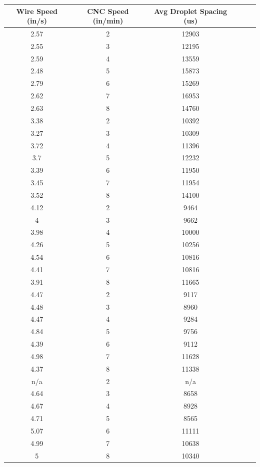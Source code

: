 \documentclass[12pt]{article}
\begin{document}
\begin{center}
\begin{tabular}{ |c|c|c|c|c|c| }
 
\end{tabular}


\end{center}

\clearpage

\begin{center}

\begin{tabular}{ |c|c|c|c|c|c| }


  \hline
  \textbf{Wire Speed (in/s)} & \textbf{CNC Speed (in/min)} & \textbf{Avg Droplet Spacing (us)} \\ \hline
  
2.57 &	2 &	12903 \\ \hline
2.55 &	3 &	12195 \\ \hline
2.59 &	4 &	13559 \\ \hline
2.48 &	5 &	15873 \\ \hline
2.79 &	6 &	15269 \\ \hline
2.62 &	7 &	16953 \\ \hline
2.63 &	8 &	14760 \\ \hline \hline
3.38 &	2 &	10392 \\ \hline
3.27 &	3 &	10309 \\ \hline
3.72 &	4 &	11396 \\ \hline
3.7 &	5 &	12232 \\ \hline
3.39 &	6 &	11950 \\ \hline
3.45 &	7 &	11954 \\ \hline
3.52 &	8 &	14100 \\ \hline \hline
4.12 &	2 &	9464 \\ \hline
4 &	3 &	9662 \\ \hline
3.98 &	4 &	10000 \\ \hline
4.26 &	5 &	10256 \\ \hline
4.54 &	6 &	10816 \\ \hline
4.41 &	7 &	10816 \\ \hline
3.91 &	8 &	11665 \\ \hline \hline
4.47 &	2 &	9117 \\ \hline
4.48 &	3 &	8960 \\ \hline
4.47 &	4 &	9284 \\ \hline
4.84 &	5 &	9756 \\ \hline
4.39 &	6 &	9112 \\ \hline
4.98 &	7 &	11628 \\ \hline
4.37 &	8 &	11338 \\ \hline \hline
n/a &	2 &	n/a \\ \hline
4.64 &	3 &	8658 \\ \hline
4.67 &	4 &	8928 \\ \hline
4.71 &	5 &	8565 \\ \hline
5.07 &	6 &	11111 \\ \hline
4.99 &	7 &	10638 \\ \hline
5 &	8 &	10340 \\ \hline	





\end{tabular}
\end{center}
\end{document}
